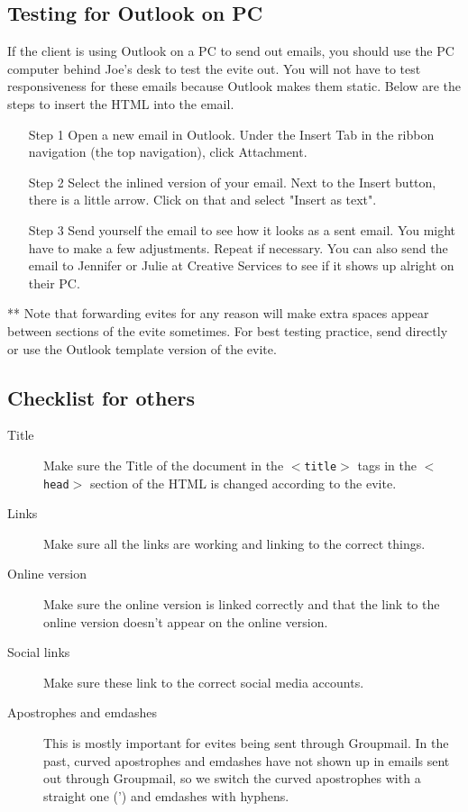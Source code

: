 \documentclass[a4paper,11pt]{article}
\begin{document}
	\subsection{Testing for Outlook on PC}
	If the client is using Outlook on a PC to send out emails, you should use the PC computer behind Joe's desk to test the evite out. You will not have to test responsiveness for these emails because Outlook makes them static. Below are the steps to insert the HTML into the email.
	\begin{itemize}
		\item[Step 1] Open a new email in Outlook. Under the Insert Tab in the ribbon navigation (the top navigation), click Attachment.
		\item[Step 2] Select the inlined version of your email. Next to the Insert button, there is a little arrow. Click on that and select "Insert as text".
		\item[Step 3] Send yourself the email to see how it looks as a sent email. You might have to make a few adjustments. Repeat if necessary. You can also send the email to Jennifer or Julie at Creative Services to see if it shows up alright on their PC. 
	\end{itemize}
	** Note that forwarding evites for any reason will make extra spaces appear between sections of the evite sometimes. For best testing practice, send directly or use the Outlook template version of the evite.
	
	\subsection{Checklist for others}
	\begin{description}
		\item[Title] Make sure the Title of the document in the \texttt{$<$title$>$} tags in the \texttt{$<$head$>$} section of the HTML is changed according to the evite. 
		\item[Links] Make sure all the links are working and linking to the correct things.
		\item[Online version] Make sure the online version is linked correctly and that the link to the online version doesn't appear on the online version.
		\item[Social links] Make sure these link to the correct social media accounts.
		\item[Apostrophes and emdashes] This is mostly important for evites being sent through Groupmail. In the past, curved apostrophes and emdashes have not shown up in emails sent out through Groupmail, so we switch the curved apostrophes with a straight one (') and emdashes with hyphens.
	\end{description} \newpage
\end{document}
